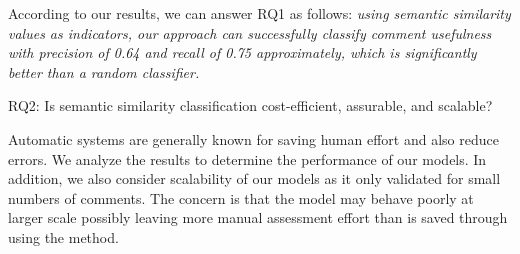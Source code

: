 



According to our results, we can answer RQ1 as follows: \emph{using semantic similarity values as indicators, our approach can successfully classify comment usefulness with precision of 0.64 and recall of 0.75 approximately, which is significantly better than a random classifier.}








\begin{ResearchQuestions}
\item[RQ2:] Is semantic similarity classification cost-efficient, assurable, and scalable?
\end{ResearchQuestions}

Automatic systems are generally known for saving human effort and also reduce errors.
We analyze the results to determine the performance of our models.
In addition, we also consider scalability of our models as it only validated for small numbers of comments. The concern is that the model may behave poorly at larger scale possibly leaving more manual assessment effort than is saved through using the method. 


